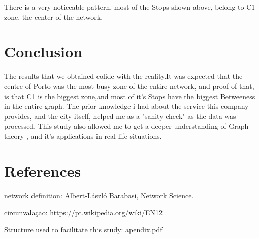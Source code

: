 \documentclass[12pt]{article}
\begin{document}
\begin{multicols}{2}
There is a very noticeable pattern, most of the Stops shown above, belong to C1 zone, the center of the network.

\section{Conclusion}
	The results that we obtained colide with the reality.It was expected that the centre of Porto was the most busy zone of the entire network, and proof of that, is that C1 is the biggest zone,and most of it's Stops have the biggest Betweeness in the entire graph. The prior knowledge i had about the service this company provides, and the city itself, helped me as a "sanity check" as the data was processed. This study also allowed me to get a deeper understanding of Graph theory , and it's applications in real life situations.
\section{References}

network definition:
Albert-László Barabasi, Network Science.

circunvalaçao:
https://pt.wikipedia.org/wiki/EN12	

Structure used to facilitate this study:
apendix.pdf
\end{multicols}	
\end{document}
